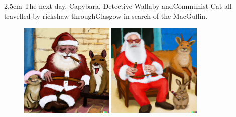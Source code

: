 \documentclass{article}
\newcommand{\imagewidthfactor}{0.4}
\newcommand{\addmarginA}{2.5em}
\newcommand{\addmarginB}{2.5em}
\begin{document}
\begin{addmargin}[\addmarginA]{\addmarginB}
The next day, Capybara, Detective Wallaby and\linebreak Communist Cat all
travelled by rickshaw through\linebreak Glasgow in search of the MacGuffin.
\end{addmargin}

\newpage %

\begin{figure}[h!]
\centering
\includegraphics[width=\imagewidthfactor\textwidth]{media/6a.png}
\quad
\includegraphics[width=\imagewidthfactor\textwidth]{media/6b.png}\\

\end{figure}
\end{document}
